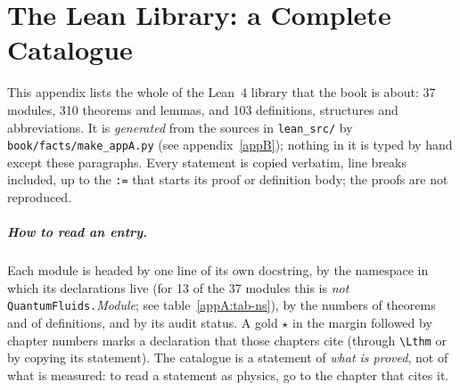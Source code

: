 \chapter{The Lean Library: a Complete Catalogue}\label{appA}
\providecommand{\citedmark}[1]{\textcolor{qfgold}{$\star$}{\fontsize{6}{6}\selectfont\,#1}}
\noindent This appendix lists the whole of the Lean~4 library  that the book is about: 37 modules, 310 theorems and lemmas, and 103 definitions, structures and abbreviations. It is \emph{generated} from the sources in \texttt{lean\_src/} by \texttt{book/facts/make\_appA.py} (see appendix~\ref{appB}); nothing in it is typed by hand except these paragraphs. Every statement is copied verbatim, line breaks included, up to the \texttt{:=} that starts its proof or definition body; the proofs are not reproduced.
\paragraph{How to read an entry.} Each module is headed by one line of its own docstring, by the namespace in which its declarations live (for 13 of the 37 modules this is \emph{not} \texttt{QuantumFluids.}\emph{Module}; see table~\ref{appA:tab-ns}), by the numbers of theorems and of definitions, and by its audit status. A gold $\star$ in the margin followed by chapter numbers marks a declaration that those chapters cite (through \texttt{\textbackslash Lthm} or by copying its statement). The catalogue is a statement of \emph{what is proved}, not of what is measured: to read a statement as physics, go to the chapter that cites it.
